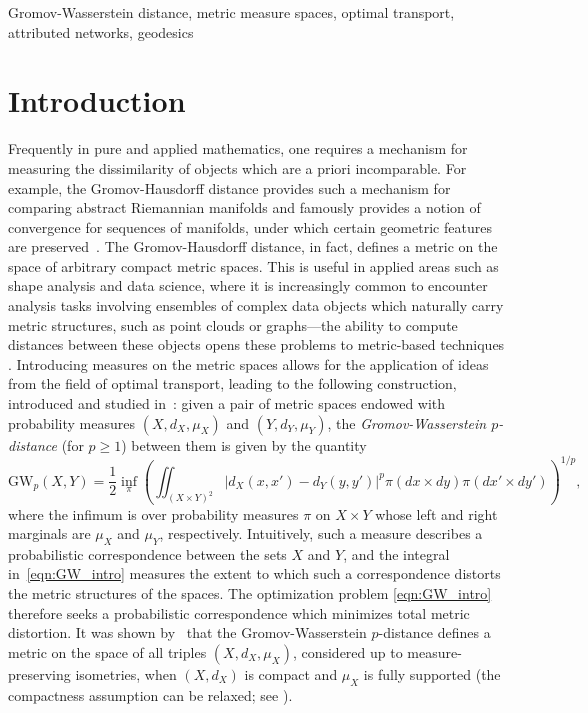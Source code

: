 \documentclass[twoside,11pt]{article}
\theoremstyle{definition}
\begin{document}
\begin{keywords}
  Gromov-Wasserstein distance, metric measure spaces, optimal transport, attributed networks, geodesics
\end{keywords}

\newpage
\tableofcontents

\section{Introduction}



Frequently in pure and applied mathematics, one requires a mechanism for measuring the dissimilarity of objects which are a priori incomparable. For example, the Gromov-Hausdorff distance provides such a mechanism for comparing abstract Riemannian manifolds and famously provides a notion of convergence for sequences of manifolds, under which certain geometric features are preserved~\citep{cheeger1997structure,Gromov2006Metric}. The Gromov-Hausdorff distance, in fact, defines a metric on the space of arbitrary compact metric spaces. This is useful in applied areas such as shape analysis and data science, where it is increasingly common to encounter analysis tasks involving ensembles of complex data objects which naturally carry metric structures, such as point clouds or graphs---the ability to compute distances between these objects opens these problems to metric-based techniques \citep{memoli2004comparing,memoli2005theoretical,chazal2009gromov,JMLR:v11:carlsson10a, memoli2012some}. Introducing measures on the metric spaces allows for the application of ideas from the field of optimal transport, leading to the following construction, introduced and studied in~\citep{memoli2007,memoli2011}: given a pair of metric spaces endowed with probability measures $(X,d_X,\mu_X)$ and $(Y,d_Y,\mu_Y)$, the \emph{Gromov-Wasserstein $p$-distance} (for $p \geq 1$) between them is given by the quantity 
\begin{equation}\label{eqn:GW_intro}
\mathrm{GW}_p(X,Y) = \frac{1}{2} \inf_{\pi} \left( \iint_{(X\times Y)^2} |d_X(x,x') - d_Y(y,y')|^p \pi(dx \times dy) \pi(dx' \times dy') \right)^{1/p},
\end{equation}
where the infimum is over probability measures $\pi$ on $X \times Y$ whose left and right marginals are $\mu_X$ and $\mu_Y$, respectively. Intuitively, such a measure describes a probabilistic correspondence between the sets $X$ and $Y$, and the integral in~\eqref{eqn:GW_intro} measures the extent to which such a correspondence distorts the metric structures of the spaces. The optimization problem \eqref{eqn:GW_intro} therefore seeks a probabilistic correspondence which minimizes total metric distortion. It was shown by~\citet{memoli2007} that the Gromov-Wasserstein $p$-distance defines a metric on the space of all triples $(X,d_X,\mu_X)$, considered up to measure-preserving isometries, when $(X,d_X)$ is compact and $\mu_X$ is fully supported (the compactness assumption can be relaxed; see \citealt{memoli2022comparison,sturm2023space}).
\end{document}
